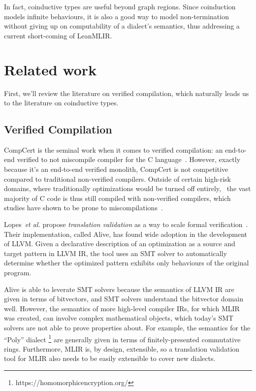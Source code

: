 \documentclass[a4paper]{scrartcl}
\newcommand*{\etal}{~\emph{et al.}}
\begin{document}
In fact, coinductive types are useful beyond graph regions. Since
coinduction models infinite behaviours, it is also a good way to model
non-termination without giving up on computability of a dialect's
semantics, thus addressing a current short-coming of LeanMLIR.



\section{Related work}\label{related-work}

First, we'll review the literature on verified compilation, which
naturally leads us to the literature on coinductive types.

\subsection{Verified Compilation}\label{verified-compilation}

CompCert is the
seminal work when it comes to verified compilation: an end-to-end
verified to not miscompile compiler for the C language~\cite{leroyCompCertFormallyVerified}.
However, exactly
because it's an end-to-end verified monolith, CompCert is not
competitive compared to traditional non-verified compilers. Outside of
certain high-risk domains, where traditionally optimizations would be
turned off entirely,~\cite{kastnerCompCertPracticalExperience} the
vast majority of C code is thus still compiled with non-verified
compilers, which studies have shown to be prone to miscompilations~\cite{yangFindingUnderstandingBugs2011}.

Lopes\etal{} propose \emph{translation validation} as a way to scale
formal verification~\cite{lopesAlive2BoundedTranslation2021}.
Their implementation, called Alive, has found wide adoption in the
development of LLVM. Given a declarative description of an optimization
as a source and target pattern in LLVM IR, the tool uses an SMT solver
to automatically determine whether the optimized pattern exhibits only
behaviours of the original program.

Alive is able to leverate SMT solvers because the semantics of LLVM IR
are given in terms of bitvectors, and SMT solvers understand the
bitvector domain well. However, the semantics of more high-level
compiler IRs, for which MLIR was created, can involve complex
mathematical objects, which today's SMT solvers are not able to prove
properties about. For example, the semantics for the ``Poly'' dialect
\footnote{https://homomorphicencryption.org/} are generally given in
terms of finitely-presented commutative rings. Furthermore, MLIR is, by
design, extensible, so a translation validation tool for MLIR also needs
to be easily extensible to cover new dialects.
\end{document}
